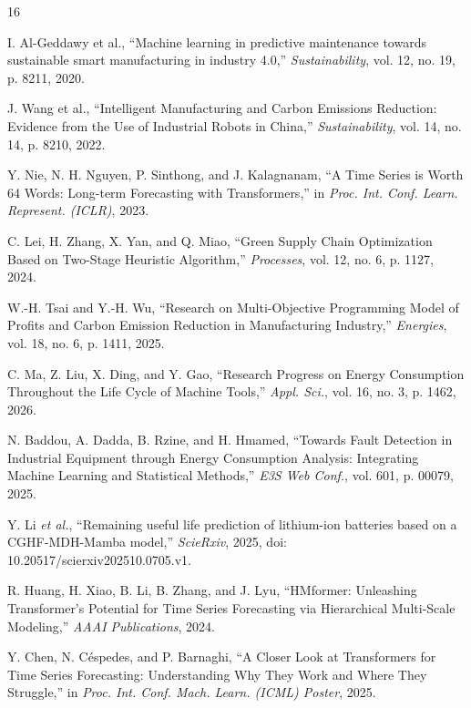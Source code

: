 \documentclass[conference]{IEEEtran}
\begin{document}
\begin{thebibliography}{16}

I. Al-Geddawy et al., ``Machine learning in predictive maintenance towards sustainable smart manufacturing in industry 4.0,'' \textit{Sustainability}, vol. 12, no. 19, p. 8211, 2020.

J. Wang et al., ``Intelligent Manufacturing and Carbon Emissions Reduction: Evidence from the Use of Industrial Robots in China,'' \textit{Sustainability}, vol. 14, no. 14, p. 8210, 2022.

Y. Nie, N. H. Nguyen, P. Sinthong, and J. Kalagnanam, ``A Time Series is Worth 64 Words: Long-term Forecasting with Transformers,'' in \textit{Proc. Int. Conf. Learn. Represent. (ICLR)}, 2023.

C. Lei, H. Zhang, X. Yan, and Q. Miao, ``Green Supply Chain Optimization Based on Two-Stage Heuristic Algorithm,'' \textit{Processes}, vol. 12, no. 6, p. 1127, 2024.

W.-H. Tsai and Y.-H. Wu, ``Research on Multi-Objective Programming Model of Profits and Carbon Emission Reduction in Manufacturing Industry,'' \textit{Energies}, vol. 18, no. 6, p. 1411, 2025.

C. Ma, Z. Liu, X. Ding, and Y. Gao, ``Research Progress on Energy Consumption Throughout the Life Cycle of Machine Tools,'' \textit{Appl. Sci.}, vol. 16, no. 3, p. 1462, 2026.

N. Baddou, A. Dadda, B. Rzine, and H. Hmamed, ``Towards Fault Detection in Industrial Equipment through Energy Consumption Analysis: Integrating Machine Learning and Statistical Methods,'' \textit{E3S Web Conf.}, vol. 601, p. 00079, 2025.

Y. Li \textit{et al.}, ``Remaining useful life prediction of lithium-ion batteries based on a CGHF-MDH-Mamba model,'' \textit{ScieRxiv}, 2025, doi: 10.20517/scierxiv202510.0705.v1.

R. Huang, H. Xiao, B. Li, B. Zhang, and J. Lyu, ``HMformer: Unleashing Transformer’s Potential for Time Series Forecasting via Hierarchical Multi-Scale Modeling,'' \textit{AAAI Publications}, 2024.

Y. Chen, N. Céspedes, and P. Barnaghi, ``A Closer Look at Transformers for Time Series Forecasting: Understanding Why They Work and Where They Struggle,'' in \textit{Proc. Int. Conf. Mach. Learn. (ICML) Poster}, 2025.


\end{thebibliography}
\end{document}
